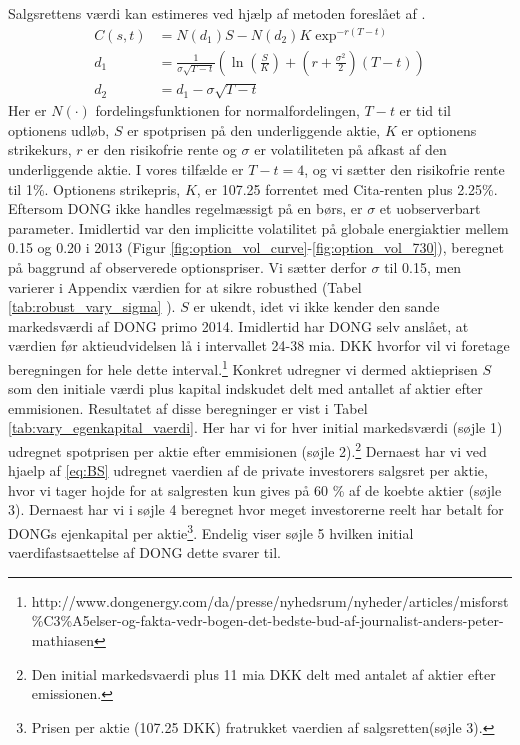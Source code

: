\documentclass{article}
\begin{document}
Salgsrettens værdi kan estimeres ved hjælp af metoden foreslået af \cite{Black1973}. 
\begin{align}
C(s,t)&=N(d_1)S-N(d_2)K \exp^{-r(T-t)} \label{eq:BS}\\
d_1&= \frac{1}{\sigma\sqrt{T-t}}\left( \ln\left( \frac{S}{K} \right)+\left(r+\frac{\sigma^2}{2} \right)(T-t) \right) \nonumber \\
d_2&=d_1-\sigma \sqrt{T-t} \nonumber
\end{align}
Her er $N(\cdot)$ fordelingsfunktionen for normalfordelingen, $T-t$ er tid til optionens udløb, $S$ er spotprisen på den underliggende aktie, $K$ er optionens strikekurs, $r$ er den risikofrie rente og $\sigma$ er volatiliteten på afkast af den underliggende aktie. I vores tilfælde er $T-t=4$, og vi sætter den risikofrie rente til 1\%. Optionens strikepris, $K$, er 107.25 forrentet med Cita-renten plus 2.25\%. Eftersom DONG ikke handles regelmæssigt på en børs, er $\sigma$ et uobserverbart parameter. Imidlertid var den implicitte volatilitet på globale energiaktier mellem 0.15 og 0.20 i 2013 (Figur \ref{fig:option_vol_curve}-\ref{fig:option_vol_730}), beregnet på baggrund af observerede optionspriser. Vi sætter derfor $\sigma$ til 0.15, men varierer i Appendix værdien for at sikre robusthed (Tabel \ref{tab:robust_vary_sigma} ). $S$ er ukendt, idet vi ikke kender den sande markedsværdi af DONG primo 2014. Imidlertid har DONG selv anslået, at værdien før aktieudvidelsen lå i intervallet 24-38 mia. DKK hvorfor vil vi foretage beregningen for hele dette interval.\footnote{http://www.dongenergy.com/da/presse/nyhedsrum/nyheder/articles/misforst\%C3\%A5elser-og-fakta-vedr-bogen-det-bedste-bud-af-journalist-anders-peter-mathiasen} Konkret udregner vi dermed aktieprisen $S$ som den initiale værdi plus kapital indskudet delt med antallet af aktier efter emmisionen. 
Resultatet af disse beregninger er vist i Tabel \ref{tab:vary_egenkapital_vaerdi}. Her har vi for hver initial markedsværdi (søjle 1) udregnet spotprisen per aktie efter emmisionen (søjle 2).\footnote{Den initial markedsvaerdi plus 11 mia DKK delt med antalet af aktier efter emissionen.} Dernaest har vi ved hjaelp af \ref{eq:BS} udregnet vaerdien af de private investorers salgsret per aktie, hvor vi tager hojde for at salgresten kun gives på 60 \% af de koebte aktier (søjle 3). Dernaest har vi i søjle 4 beregnet hvor meget investorerne reelt har betalt for DONGs ejenkapital per aktie\footnote{Prisen per aktie (107.25 DKK) fratrukket vaerdien af salgsretten(søjle 3).}. Endelig viser søjle 5 hvilken initial vaerdifastsaettelse af DONG dette svarer til. 
 
\end{document}
